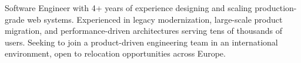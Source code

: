 
Software Engineer with 4+ years of experience designing and scaling production-grade web systems. 
Experienced in legacy modernization, large-scale product migration, and performance-driven architectures serving tens of thousands of users. 
Seeking to join a product-driven engineering team in an international environment, open to relocation opportunities across Europe.
